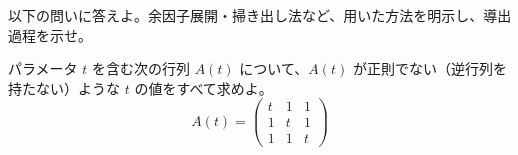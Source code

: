 
以下の問いに答えよ。余因子展開・掃き出し法など、用いた方法を明示し、導出過程を示せ。

パラメータ $t$ を含む次の行列 $A(t)$ について、$A(t)$ が正則でない（逆行列を持たない）ような $t$ の値をすべて求めよ。
\[
A(t) =
\begin{pmatrix}
t & 1 & 1 \\
1 & t & 1 \\
1 & 1 & t
\end{pmatrix}
\]

